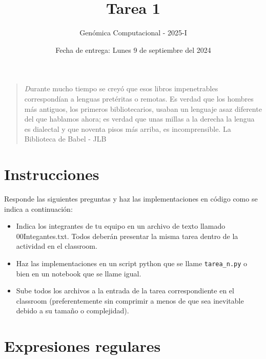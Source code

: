 \documentclass[letter]{article}
\title{Tarea 1}
\date{Fecha de entrega: Lunes 9 de septiembre del 2024 }
\author{Genómica Computacional - 2025-I}
\begin{document}
\maketitle

    \begin{quote}
      {\emph Durante mucho tiempo se creyó que esos libros impenetrables 
      correspondían a lenguas pretéritas o remotas. Es verdad que los hombres más
      antiguos, los primeros bibliotecarios, usaban un lenguaje asaz diferente del
      que hablamos ahora; es verdad que unas millas a la derecha la lengua es dialectal
      y que noventa pisos más arriba, es incomprensible.
      \hfill{La Biblioteca de Babel - JLB}}
    \end{quote}
    
    
    
    \section{Instrucciones}
    Responde las siguientes preguntas y haz las implementaciones en código 
    como se indica a continuación:\\
    \begin{itemize}
        \item Indica los integrantes de tu equipo en un archivo de texto llamado 00Integantes.txt.
    Todos deberán presentar la misma tarea dentro de la actividad en el classroom.\\
        \item Haz las implementaciones en un script python que se llame {\tt{tarea\_n.py}} o bien en un 
    notebook que se llame igual.\\
        \item Sube todos los archivos a la entrada de la tarea correspondiente en el classroom 
    (preferentemente sin comprimir a menos de que sea inevitable debido a su tamaño o complejidad).
    
    \end{itemize}
    
    \section{Expresiones regulares}
    
\end{document}
